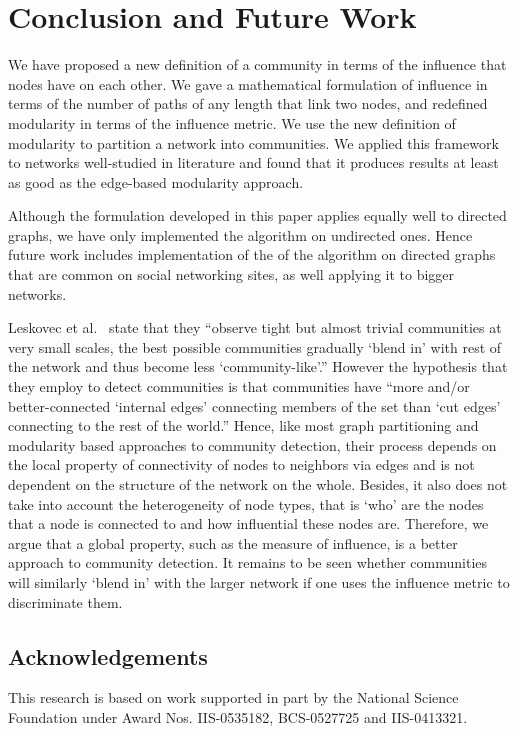 \documentclass{sig-alternate}
\begin{document}
\section{Conclusion and Future Work}
\label{sec:conclusion}
We have proposed a new definition of a community in terms of the influence that nodes have on each other. We gave a mathematical formulation of influence in terms of the number of paths of any length that link two nodes, and redefined modularity in terms of the influence metric. We use the new definition of modularity to partition a network into communities. We applied this framework to networks well-studied in literature and found that it produces results at least as good as the edge-based modularity approach.


Although the formulation developed in this paper applies equally well to directed graphs, we have only implemented the algorithm on undirected ones. Hence future work includes implementation of the of the algorithm on directed graphs that are common on social networking sites, as well applying it to bigger networks.


Leskovec et al.~\cite{Leskovec08www} state that they ``observe tight but almost trivial communities at very small scales, the best possible communities gradually `blend in'  with rest of the network  and thus become less `community-like'.'' However the hypothesis that they employ to detect communities  is that communities have ``more and/or better-connected `internal edges' connecting members of the set than `cut edges' connecting to the rest of the world.'' Hence, like most graph partitioning and modularity based approaches to community detection, their process depends on the local property of connectivity of nodes to neighbors via edges and is not dependent on the structure of the network on the whole. Besides, it also  does not take into account the heterogeneity of node types, that is `who' are the nodes that a node is connected to and how influential these nodes are. Therefore, we argue that a global property, such as the measure of influence, is a better approach to community detection. It remains to be seen whether communities will similarly `blend in' with the larger network if one uses the influence metric to discriminate them. 




\subsection*{Acknowledgements}
This research is based on work supported
in part by the National Science Foundation under Award Nos.
IIS-0535182, BCS-0527725 and IIS-0413321. 
\end{document}

